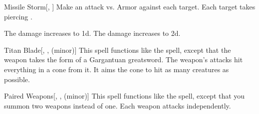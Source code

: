 \lowercase{\hypertarget{spell:Missile Storm}{}}\label{spell:Missile Storm}
\begin{freeability}[Rank 4]{\hypertarget{spell:Missile Storm}{Missile Storm}}[, ]
Make an attack vs. Armor against each target.
\hit Each target takes piercing .

\rankline
{} The damage increases to  \plus1d.
 The damage increases to  \plus2d.
\end{freeability}
\vspace{0.25em}



\lowercase{\hypertarget{spell:Titan Blade}{}}\label{spell:Titan Blade}
\begin{freeability}[Rank 7]{\hypertarget{spell:Titan Blade}{Titan Blade}}[, ,  (minor)]
This spell functions like the  spell, except that the weapon takes the form of a Gargantuan greatsword.
The weapon's attacks hit everything in a \areamed cone from it.
It aims the cone to hit as many creatures as possible.
\end{freeability}
\vspace{0.25em}



\lowercase{\hypertarget{spell:Paired Weapons}{}}\label{spell:Paired Weapons}
\begin{freeability}[Rank 8]{\hypertarget{spell:Paired Weapons}{Paired Weapons}}[, ,  (minor)]
This spell functions like the  spell, except that you summon two weapons instead of one.
Each weapon attacks independently.
\end{freeability}
\vspace{0.25em}

